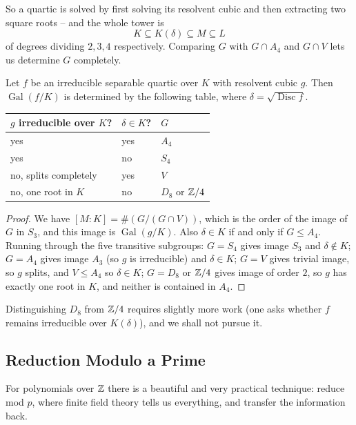\documentclass[a4paper]{scrartcl}
\newcommand{\Gal}{\operatorname{Gal}}
\newcommand{\Disc}{\operatorname{Disc}}
\begin{document}
So a quartic is solved by first solving its resolvent cubic and then extracting two square roots -- and the whole tower is
$$K \subseteq K(\delta) \subseteq M \subseteq L$$
of degrees dividing $2, 3, 4$ respectively. Comparing $G$ with $G \cap A_4$ and $G \cap V$ lets us determine $G$ completely.

\begin{proposition}
	Let $f$ be an irreducible separable quartic over $K$ with resolvent cubic $g$. Then $\Gal(f/K)$ is determined by the following table, where $\delta = \sqrt{\Disc f}$.
	\begin{center}
		\begin{tabular}{lll}
			\hline
			$g$ irreducible over $K$? & $\delta \in K$? & $G$ \\
			\hline
			yes & yes & $A_4$ \\
			yes & no & $S_4$ \\
			no, splits completely & yes & $V$ \\
			no, one root in $K$ & no & $D_8$ or $\mathbb{Z}/4$ \\
			\hline
		\end{tabular}
	\end{center}
\end{proposition}

\begin{proof}
	We have $[M:K] = \#(G/(G\cap V))$, which is the order of the image of $G$ in $S_3$, and this image is $\Gal(g/K)$. Also $\delta \in K$ if and only if $G \leq A_4$. Running through the five transitive subgroups: $G = S_4$ gives image $S_3$ and $\delta\notin K$; $G = A_4$ gives image $A_3$ (so $g$ is irreducible) and $\delta \in K$; $G = V$ gives trivial image, so $g$ splits, and $V \leq A_4$ so $\delta\in K$; $G = D_8$ or $\mathbb{Z}/4$ gives image of order $2$, so $g$ has exactly one root in $K$, and neither is contained in $A_4$.
\end{proof}

Distinguishing $D_8$ from $\mathbb{Z}/4$ requires slightly more work (one asks whether $f$ remains irreducible over $K(\delta)$), and we shall not pursue it.

\subsection{Reduction Modulo a Prime}

For polynomials over $\mathbb{Z}$ there is a beautiful and very practical technique: reduce mod $p$, where finite field theory tells us everything, and transfer the information back.
\end{document}
